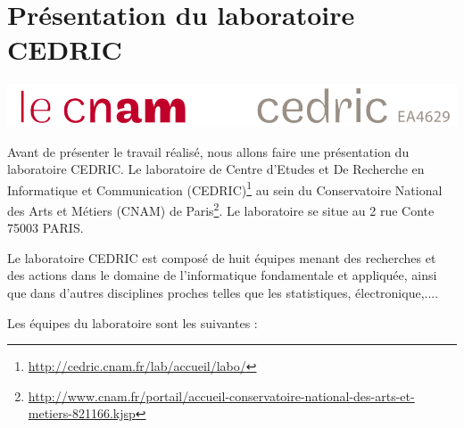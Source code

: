 \documentclass{article}
\begin{document}
\section{Présentation du laboratoire CEDRIC}\label{sec:cedric}
	\begin{center}
		\includegraphics[scale=0.55]{../include/logo-cedric.PNG}\\
	\end{center}\par
	Avant de présenter le travail réalisé, nous allons faire une présentation du laboratoire CEDRIC.
	Le laboratoire de Centre d'Etudes et De Recherche en Informatique et Communication (CEDRIC)\footnote{\href{http://cedric.cnam.fr/lab/accueil/labo/}{http://cedric.cnam.fr/lab/accueil/labo/}} au sein du Conservatoire National des Arts et Métiers (CNAM) de Paris\footnote{\href{http://www.cnam.fr/portail/accueil-conservatoire-national-des-arts-et-metiers-821166.kjsp}{http://www.cnam.fr/portail/accueil-conservatoire-national-des-arts-et-metiers-821166.kjsp}}. 
	Le laboratoire se situe au 2 rue Conte 75003 PARIS.\par
	Le laboratoire CEDRIC est composé de huit équipes menant des recherches et des actions dans le domaine de l'informatique fondamentale et appliquée, ainsi que dans d'autres disciplines proches telles que les statistiques, électronique,....\par
	Les équipes du laboratoire sont les suivantes :
\end{document}
